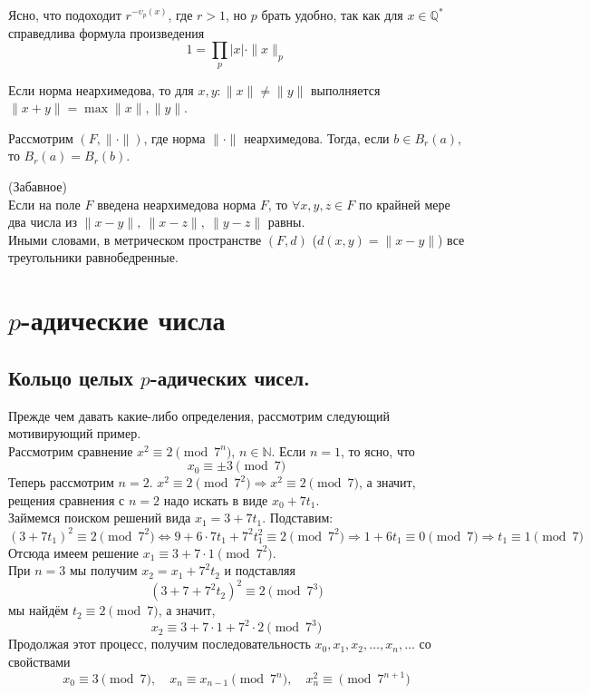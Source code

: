 \documentclass[11pt]{article}
\begin{document}
    \begin{remark}
        Ясно, что подоходит $r^{-\upsilon_p(x)}$, где $r > 1$, но $p$ брать удобно, так как для $x \in \mathbb{Q}^{*}$ справедлива формула произведения
        \[ 1 = \prod\limits_{p} |x| \cdot  \| x \|_{p} \]
    \end{remark}
    \begin{lemma}
        Если норма неархимедова, то для $x, y\colon \| x \| \neq \| y \|$ выполняется $\| x + y \| = \max{\| x \|, \| y \| }$.
    \end{lemma}
    \begin{corollary}
        Рассмотрим $(F, \| \cdot \| )$, где норма $\| \cdot \|$ неархимедова. Тогда, если  $b \in B_r(a)$, то $B_r(a) = B_r(b)$.
     \end{corollary}
    \begin{corollary} (Забавное)\\
        Если на поле $F$ введена неархимедова норма $F$, то $\forall x, y, z \in F$ по крайней мере два числа из
        $\| x - y \|, \ \| x - z \|, \ \| y - z\| $ равны. \\
        Иными словами, в метрическом пространстве $(F, d)$ ($d(x, y) = \| x - y \| $) все треугольники равнобедренные.
    \end{corollary}

   \section{$p$-адические числа}
   \subsection{Кольцо целых $p$-адических чисел.}

    Прежде чем давать какие-либо определения, рассмотрим следующий мотивирующий пример. \\
    Рассмотрим сравнение $x^2 \equiv 2 \pmod{7^n}$, $n \in \mathbb{N}$. Если $n = 1$, то ясно, что
    \[ x_0 \equiv \pm 3 \pmod{7} \]
    Теперь рассмотрим $n = 2$. $x^2 \equiv 2 \pmod{7^2} \Rightarrow x^2 \equiv 2
    \pmod{7}$, а значит, рещения сравнения с $n = 2$ надо искать в виде $x_0 + 7t_1$.\\
    Займемся поиском решений вида $x_1 = 3 + 7t_1$. Подставим:
    \[ (3 + 7t_1)^2 \equiv 2 \pmod{7^2} \Leftrightarrow 9 + 6 \cdot 7t_1 + 7^2 t_1^2 \equiv 2 \pmod{7^2} \Rightarrow 1 + 6t_1 \equiv 0 \pmod{7} \Rightarrow t_1 \equiv 1 \pmod 7 \]
    Отсюда имеем решение  $x_1 \equiv 3 + 7 \cdot 1 \pmod{7^2}$.\\
    При $n = 3$ мы получим $x_2 = x_1 + 7^2 t_2$ и подставляя
    \[ (3 + 7 + 7^2 t_2)^2 \equiv 2 \pmod{7^3} \]
    мы найдём $t_2 \equiv 2 \pmod{7}$, а значит,
    \[ x_2 \equiv 3 + 7 \cdot 1 + 7^2 \cdot 2 \pmod{7^3} \]
    Продолжая этот процесс, получим последовательность $x_0, x_1, x_2, \ldots, x_n, \ldots$ со свойствами
    \[ x_0 \equiv 3 \pmod{7}, \quad x_n \equiv x_{n - 1} \pmod{7^n}, \quad x_n^2 \equiv \pmod{7^{n + 1}} \]
\end{document}
